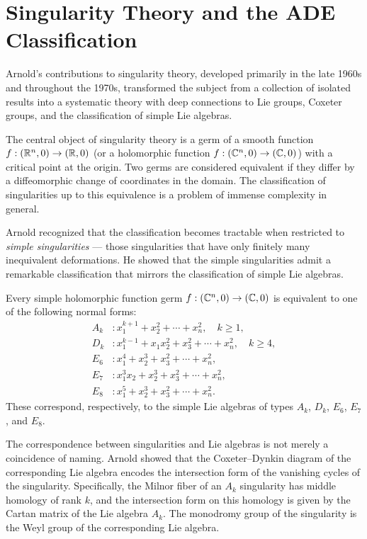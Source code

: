 \section{Singularity Theory and the ADE Classification}

Arnold's contributions to singularity theory, developed primarily in the late 1960s and throughout the 1970s, transformed the subject from a collection of isolated results into a systematic theory with deep connections to Lie groups, Coxeter groups, and the classification of simple Lie algebras.

The central object of singularity theory is a germ of a smooth function \(f: (\mathbb{R}^n,0) \to (\mathbb{R},0)\) (or a holomorphic function \(f: (\mathbb{C}^n,0) \to (\mathbb{C},0)\)) with a critical point at the origin. Two germs are considered equivalent if they differ by a diffeomorphic change of coordinates in the domain. The classification of singularities up to this equivalence is a problem of immense complexity in general.

Arnold recognized that the classification becomes tractable when restricted to \emph{simple singularities} --- those singularities that have only finitely many inequivalent deformations. He showed that the simple singularities admit a remarkable classification that mirrors the classification of simple Lie algebras.

\begin{theorem}
Every simple holomorphic function germ \(f: (\mathbb{C}^n,0) \to (\mathbb{C},0)\) is equivalent to one of the following normal forms:
\begin{align*}
A_k &: x_1^{k+1} + x_2^2 + \cdots + x_n^2, \quad k \geq 1,\\
D_k &: x_1^{k-1} + x_1 x_2^2 + x_3^2 + \cdots + x_n^2, \quad k \geq 4,\\
E_6 &: x_1^4 + x_2^3 + x_3^2 + \cdots + x_n^2,\\
E_7 &: x_1^3 x_2 + x_2^3 + x_3^2 + \cdots + x_n^2,\\
E_8 &: x_1^5 + x_2^3 + x_3^2 + \cdots + x_n^2.
\end{align*}
These correspond, respectively, to the simple Lie algebras of types \(A_k\), \(D_k\), \(E_6\), \(E_7\), and \(E_8\).
\end{theorem}

The correspondence between singularities and Lie algebras is not merely a coincidence of naming. Arnold showed that the Coxeter--Dynkin diagram of the corresponding Lie algebra encodes the intersection form of the vanishing cycles of the singularity. Specifically, the Milnor fiber of an \(A_k\) singularity has middle homology of rank \(k\), and the intersection form on this homology is given by the Cartan matrix of the Lie algebra \(A_k\). The monodromy group of the singularity is the Weyl group of the corresponding Lie algebra.

